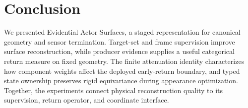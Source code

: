 \section{Conclusion}
We presented Evidential Actor Surfaces, a staged representation for canonical geometry and sensor termination.
Target-set and frame supervision improve surface reconstruction, while producer evidence supplies a useful
categorical return measure on fixed geometry. The finite attenuation identity characterizes how component
weights affect the deployed early-return boundary, and typed state ownership preserves rigid equivariance
during appearance optimization. Together, the experiments connect physical reconstruction quality to its
supervision, return operator, and coordinate interface.

